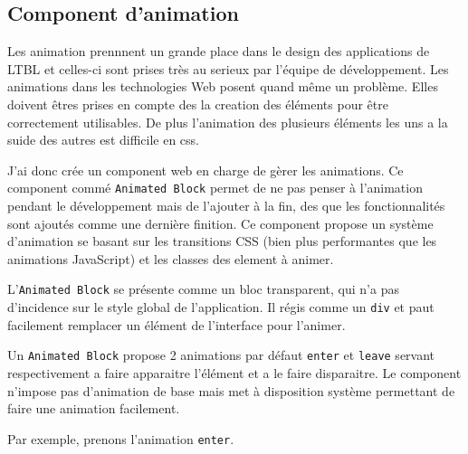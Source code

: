 \clearpage

\subsection{Component d'animation}

Les animation prennnent un grande place dans le design des applications de LTBL et celles-ci sont prises très au serieux par l'équipe de développement.
Les animations dans les technologies Web posent quand même un problème.
Elles doivent êtres prises en compte des la creation des éléments pour être correctement utilisables.
De plus l'animation des plusieurs éléments les uns a la suide des autres est difficile en css.

J'ai donc crée un component web en charge de gèrer les animations.
Ce component commé \texttt{Animated Block} permet de ne pas penser à l'animation pendant le développement mais de l'ajouter à la fin, des que les fonctionnalités sont ajoutés comme une dernière finition.
Ce component propose un système d'animation se basant sur les transitions CSS (bien plus performantes que les animations JavaScript) et les classes des element à animer.

L'\texttt{Animated Block} se présente comme un bloc transparent, qui n'a pas d'incidence sur le style global de l'application.
Il régis comme un \texttt{div} et paut facilement remplacer un élément de l'interface pour l'animer.

Un \texttt{Animated Block} propose 2 animations par défaut \texttt{enter} et \texttt{leave} servant respectivement a faire apparaitre l'élément et a le faire disparaitre.
Le component n'impose pas d'animation de base mais met à disposition système permettant de faire une animation facilement.

Par exemple, prenons l'animation \texttt{enter}.

